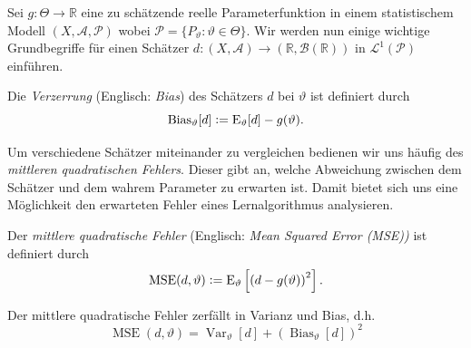 Sei $g\colon \Theta \to \mathbb {R}$ eine zu schätzende reelle Parameterfunktion in einem statistischem Modell $(X,{\mathcal {A}},\mathcal{P})$ wobei $\mathcal{P} = \{P_{\vartheta } \colon \vartheta \in \Theta \}$. Wir werden nun einige wichtige Grundbegriffe für einen Schätzer $d \colon (X, \mathcal{A}) \rightarrow (\mathbb{R}, \mathcal{B}(\mathbb{R}))$ in $\mathcal{L}^1(\mathcal{P})$ einführen.

\begin{defn}
Die \textit{Verzerrung} (Englisch: \textit{Bias}) des Schätzers $d$ bei $\vartheta$ ist definiert durch
$$\operatorname {Bias} _{\vartheta }[d] \vcentcolon= \operatorname {E} _{\vartheta }[d]-g(\vartheta ).$$
\end{defn}


Um verschiedene Schätzer miteinander zu vergleichen bedienen wir uns häufig des \textit{mittleren quadratischen Fehlers}. Dieser gibt an, welche Abweichung zwischen dem Schätzer und dem wahrem Parameter zu erwarten ist. Damit bietet sich uns eine Möglichkeit den erwarteten Fehler eines Lernalgorithmus analysieren.

\begin{defn}
Der \textit{mittlere quadratische Fehler} (Englisch: \textit{Mean Squared Error (MSE))} ist definiert durch
$$\operatorname {MSE} (d,\vartheta ) \vcentcolon= \operatorname{E} _{\vartheta}\left[\left(d-g(\vartheta )\right)^{2}\right].$$
\end{defn}

\begin{thm}
Der mittlere quadratische Fehler zerfällt in Varianz und Bias, d.h.
$$\operatorname{MSE} (d,\vartheta) = \operatorname{Var}_{\vartheta}[d]+\left(\operatorname{Bias}_{\vartheta}[d]\right)^{2}$$
\end{thm}

